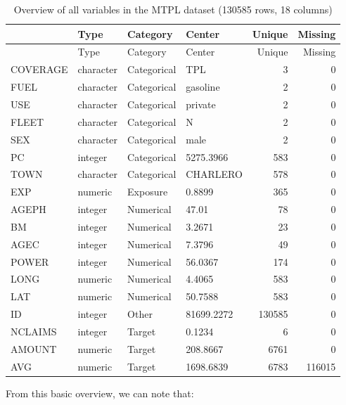 \documentclass[
  english,
  11pt,
]{article}
\begin{document}
\begin{longtable}[]{@{}llllrr@{}}
\caption{Overview of all variables in the MTPL dataset (130585 rows, 18
columns)}\tabularnewline
\toprule\noalign{}
& Type & Category & Center & Unique & Missing \\
\midrule\noalign{}
\endfirsthead
\toprule\noalign{}
& Type & Category & Center & Unique & Missing \\
\midrule\noalign{}
\endhead
\bottomrule\noalign{}
\endlastfoot
COVERAGE & character & Categorical & TPL & 3 & 0 \\
FUEL & character & Categorical & gasoline & 2 & 0 \\
USE & character & Categorical & private & 2 & 0 \\
FLEET & character & Categorical & N & 2 & 0 \\
SEX & character & Categorical & male & 2 & 0 \\
PC & integer & Categorical & 5275.3966 & 583 & 0 \\
TOWN & character & Categorical & CHARLERO & 578 & 0 \\
EXP & numeric & Exposure & 0.8899 & 365 & 0 \\
AGEPH & integer & Numerical & 47.01 & 78 & 0 \\
BM & integer & Numerical & 3.2671 & 23 & 0 \\
AGEC & integer & Numerical & 7.3796 & 49 & 0 \\
POWER & integer & Numerical & 56.0367 & 174 & 0 \\
LONG & numeric & Numerical & 4.4065 & 583 & 0 \\
LAT & numeric & Numerical & 50.7588 & 583 & 0 \\
ID & integer & Other & 81699.2272 & 130585 & 0 \\
NCLAIMS & integer & Target & 0.1234 & 6 & 0 \\
AMOUNT & numeric & Target & 208.8667 & 6761 & 0 \\
AVG & numeric & Target & 1698.6839 & 6783 & 116015 \\
\end{longtable}

From this basic overview, we can note that:
\end{document}
